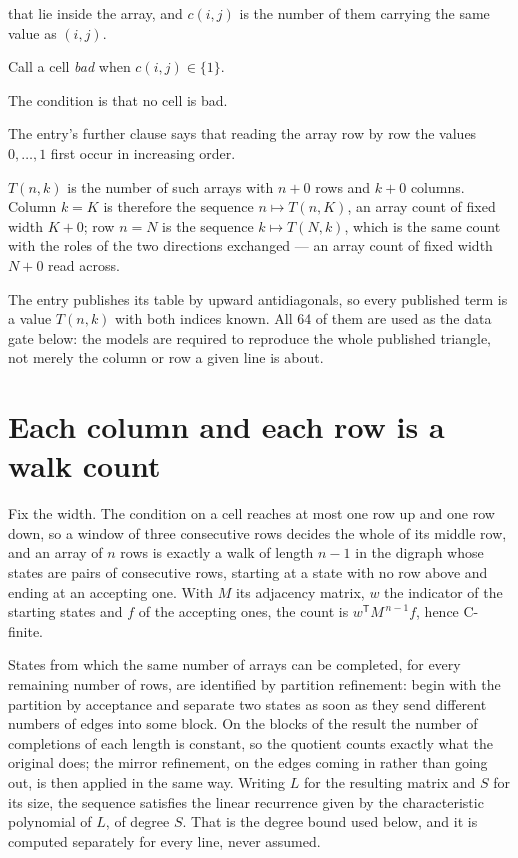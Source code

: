 \documentclass[11pt]{article}
\theoremstyle{definition}
\begin{document}
that lie inside the array, and $c(i,j)$ is the number of them carrying the same value as $(i,j)$.

Call a cell {\itshape bad} when $c(i,j) \in \{1\}$.

The condition is that no cell is bad.

The entry's further clause says that reading the array row by row the values $0,\dots,1$ first occur in increasing order.

$T(n,k)$ is the number of such arrays with $n + 0$ rows and $k + 0$ columns. Column $k = K$ is therefore the sequence $n \mapsto T(n,K)$, an array count of fixed width $K + 0$; row $n = N$ is the sequence $k \mapsto T(N,k)$, which is the same count with the roles of the two directions exchanged --- an array count of fixed width $N + 0$ read across.

The entry publishes its table by upward antidiagonals, so every published term is a value $T(n,k)$ with both indices known. All 64 of them are used as the data gate below: the models are required to reproduce the whole published triangle, not merely the column or row a given line is about.

\section{Each column and each row is a walk count}

Fix the width. The condition on a cell reaches at most one row up and one row down, so a window of three consecutive rows decides the whole of its middle row, and an array of $n$ rows is exactly a walk of length $n-1$ in the digraph whose states are pairs of consecutive rows, starting at a state with no row above and ending at an accepting one. With $M$ its adjacency matrix, $w$ the indicator of the starting states and $f$ of the accepting ones, the count is $w^{\mathsf T}M^{\,n-1}f$, hence C-finite.

States from which the same number of arrays can be completed, for every remaining number of rows, are identified by partition refinement: begin with the partition by acceptance and separate two states as soon as they send different numbers of edges into some block. On the blocks of the result the number of completions of each length is constant, so the quotient counts exactly what the original does; the mirror refinement, on the edges coming in rather than going out, is then applied in the same way. Writing $L$ for the resulting matrix and $S$ for its size, the sequence satisfies the linear recurrence given by the characteristic polynomial of $L$, of degree $S$. That is the degree bound used below, and it is computed separately for every line, never assumed.
\end{document}
